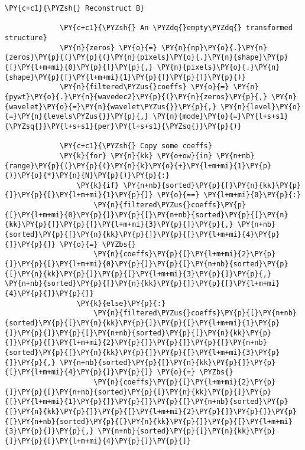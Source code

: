 \begin{Verbatim}[commandchars=\\\{\}]
             \PY{c+c1}{\PYZsh{} Reconstruct B}
         
             \PY{c+c1}{\PYZsh{} An \PYZdq{}empty\PYZdq{} transformed structure}
             \PY{n}{zeros} \PY{o}{=} \PY{n}{np}\PY{o}{.}\PY{n}{zeros}\PY{p}{(}\PY{p}{(}\PY{n}{pixels}\PY{o}{.}\PY{n}{shape}\PY{p}{[}\PY{l+m+mi}{0}\PY{p}{]}\PY{p}{,} \PY{n}{pixels}\PY{o}{.}\PY{n}{shape}\PY{p}{[}\PY{l+m+mi}{1}\PY{p}{]}\PY{p}{)}\PY{p}{)}
             \PY{n}{filtered\PYZus{}coeffs} \PY{o}{=} \PY{n}{pywt}\PY{o}{.}\PY{n}{wavedec2}\PY{p}{(}\PY{n}{zeros}\PY{p}{,} \PY{n}{wavelet}\PY{o}{=}\PY{n}{wavelet\PYZus{}}\PY{p}{,} \PY{n}{level}\PY{o}{=}\PY{n}{levels\PYZus{}}\PY{p}{,} \PY{n}{mode}\PY{o}{=}\PY{l+s+s1}{\PYZsq{}}\PY{l+s+s1}{per}\PY{l+s+s1}{\PYZsq{}}\PY{p}{)}
         
             \PY{c+c1}{\PYZsh{} Copy some coeffs}
             \PY{k}{for} \PY{n}{kk} \PY{o+ow}{in} \PY{n+nb}{range}\PY{p}{(}\PY{p}{(}\PY{n}{k}\PY{o}{+}\PY{l+m+mi}{1}\PY{p}{)}\PY{o}{*}\PY{n}{N}\PY{p}{)}\PY{p}{:}
                 \PY{k}{if} \PY{n+nb}{sorted}\PY{p}{[}\PY{n}{kk}\PY{p}{]}\PY{p}{[}\PY{l+m+mi}{1}\PY{p}{]} \PY{o}{==} \PY{l+m+mi}{0}\PY{p}{:}
                     \PY{n}{filtered\PYZus{}coeffs}\PY{p}{[}\PY{l+m+mi}{0}\PY{p}{]}\PY{p}{[}\PY{n+nb}{sorted}\PY{p}{[}\PY{n}{kk}\PY{p}{]}\PY{p}{[}\PY{l+m+mi}{3}\PY{p}{]}\PY{p}{,} \PY{n+nb}{sorted}\PY{p}{[}\PY{n}{kk}\PY{p}{]}\PY{p}{[}\PY{l+m+mi}{4}\PY{p}{]}\PY{p}{]} \PY{o}{=} \PYZbs{}
                     \PY{n}{coeffs}\PY{p}{[}\PY{l+m+mi}{2}\PY{p}{]}\PY{p}{[}\PY{l+m+mi}{0}\PY{p}{]}\PY{p}{[}\PY{n+nb}{sorted}\PY{p}{[}\PY{n}{kk}\PY{p}{]}\PY{p}{[}\PY{l+m+mi}{3}\PY{p}{]}\PY{p}{,} \PY{n+nb}{sorted}\PY{p}{[}\PY{n}{kk}\PY{p}{]}\PY{p}{[}\PY{l+m+mi}{4}\PY{p}{]}\PY{p}{]}
                 \PY{k}{else}\PY{p}{:}
                     \PY{n}{filtered\PYZus{}coeffs}\PY{p}{[}\PY{n+nb}{sorted}\PY{p}{[}\PY{n}{kk}\PY{p}{]}\PY{p}{[}\PY{l+m+mi}{1}\PY{p}{]}\PY{p}{]}\PY{p}{[}\PY{n+nb}{sorted}\PY{p}{[}\PY{n}{kk}\PY{p}{]}\PY{p}{[}\PY{l+m+mi}{2}\PY{p}{]}\PY{p}{]}\PY{p}{[}\PY{n+nb}{sorted}\PY{p}{[}\PY{n}{kk}\PY{p}{]}\PY{p}{[}\PY{l+m+mi}{3}\PY{p}{]}\PY{p}{,} \PY{n+nb}{sorted}\PY{p}{[}\PY{n}{kk}\PY{p}{]}\PY{p}{[}\PY{l+m+mi}{4}\PY{p}{]}\PY{p}{]} \PY{o}{=} \PYZbs{}
                     \PY{n}{coeffs}\PY{p}{[}\PY{l+m+mi}{2}\PY{p}{]}\PY{p}{[}\PY{n+nb}{sorted}\PY{p}{[}\PY{n}{kk}\PY{p}{]}\PY{p}{[}\PY{l+m+mi}{1}\PY{p}{]}\PY{p}{]}\PY{p}{[}\PY{n+nb}{sorted}\PY{p}{[}\PY{n}{kk}\PY{p}{]}\PY{p}{[}\PY{l+m+mi}{2}\PY{p}{]}\PY{p}{]}\PY{p}{[}\PY{n+nb}{sorted}\PY{p}{[}\PY{n}{kk}\PY{p}{]}\PY{p}{[}\PY{l+m+mi}{3}\PY{p}{]}\PY{p}{,} \PY{n+nb}{sorted}\PY{p}{[}\PY{n}{kk}\PY{p}{]}\PY{p}{[}\PY{l+m+mi}{4}\PY{p}{]}\PY{p}{]}
         

\end{Verbatim}

